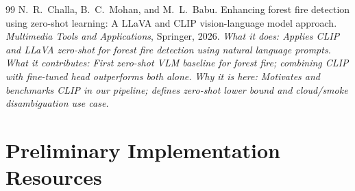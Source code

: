 \documentclass[11pt,twocolumn]{article}
\begin{document}
\begin{thebibliography}{99}
N.~R.~Challa, B.~C.~Mohan, and M.~L.~Babu.
\newblock Enhancing forest fire detection using zero-shot learning:
A {LLaVA} and {CLIP} vision-language model approach.
\newblock \textit{Multimedia Tools and Applications}, Springer, 2026.
\newblock \textit{What it does: Applies CLIP and LLaVA zero-shot for
forest fire detection using natural language prompts.}
\newblock \textit{What it contributes: First zero-shot VLM baseline for
forest fire; combining CLIP with fine-tuned head outperforms both alone.}
\newblock \textit{Why it is here: Motivates and benchmarks CLIP in our
pipeline; defines zero-shot lower bound and cloud/smoke disambiguation
use case.}

\end{thebibliography}

\section{Preliminary Implementation Resources}
\label{sec:resources}
\end{document}
